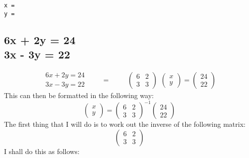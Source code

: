 \documentclass[a4paper,10pt]{article}
\begin{document}
      \texttt{x = }
      \\
      \texttt{y = }

      \newpage

      \subsection{6x + 2y = 24\\3x - 3y = 22}
      \[
        \begin{split}
          6x + 2y = 24\\3x - 3y = 22
        \end{split}
        \qquad
        =
        \qquad
        \begin{split}
          \begin{pmatrix}
            6 & 2\\3 & 3
          \end{pmatrix}
        \end{split}
        \begin{pmatrix}
          x\\y
        \end{pmatrix}
        =
        \begin{pmatrix}
          24\\22
        \end{pmatrix}
      \]
      This can then be formatted in the following way:
      \begin{equation*}
        \begin{pmatrix}
          x\\y
        \end{pmatrix}
        =
        \begin{pmatrix}
          6 & 2\\3 & 3
        \end{pmatrix}
        ^{-1}
        \begin{pmatrix}
          24\\22
        \end{pmatrix}
      \end{equation*}
      The first thing that I will do is to work out the inverse of the following matrix:
      \begin{equation*}
         \begin{pmatrix}
           6 & 2\\3 & 3
         \end{pmatrix}
      \end{equation*}
      I shall do this as follows:
\end{document}
